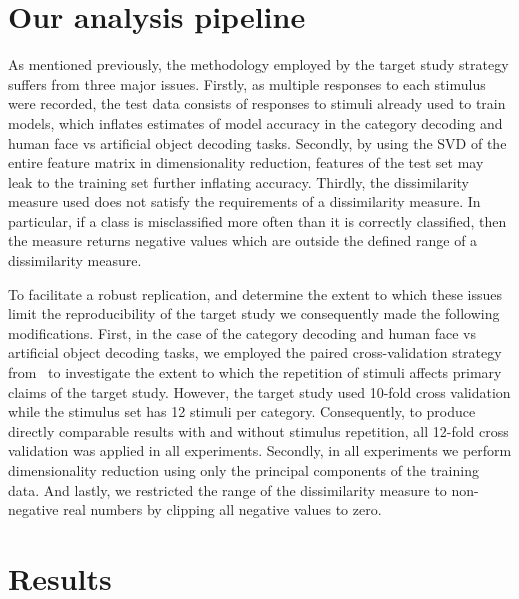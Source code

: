 \section{Our analysis pipeline}
As mentioned previously, the methodology employed by the target study strategy suffers from three major issues. Firstly, as multiple responses to each stimulus were recorded, the test data consists of responses to stimuli already used to train models, which inflates estimates of model accuracy in the category decoding and human face vs artificial object decoding tasks. Secondly, by using the SVD of the entire feature matrix in dimensionality reduction, features of the test set may leak to the training set further inflating accuracy. Thirdly, the dissimilarity measure used does not satisfy the requirements of a dissimilarity measure. In particular, if a class is misclassified more often than it is correctly classified, then the measure returns negative values which are outside the defined range of a dissimilarity measure. 

To facilitate a robust replication, and determine the extent to which these issues limit the reproducibility of the target study we consequently made the following modifications. First, in the case of the category decoding and human face vs artificial object decoding tasks, we employed the paired cross-validation strategy from~\textcite{Kilgallen:2025} to investigate the extent to which the repetition of stimuli affects primary claims of the target study. However, the target study used 10-fold cross validation while the stimulus set has 12 stimuli per category. Consequently, to produce directly comparable results with and without stimulus repetition, all 12-fold cross validation was applied in all experiments. Secondly, in all experiments we perform dimensionality reduction using only the principal components of the training data. And lastly, we restricted the range of the dissimilarity measure to non-negative real numbers by clipping all negative values to zero.

\section{Results}

